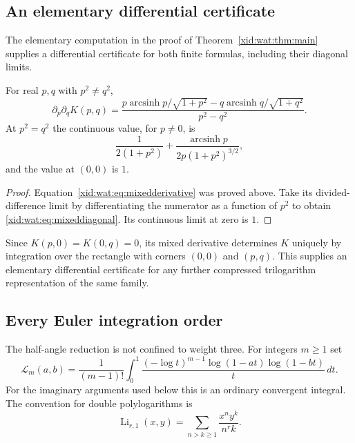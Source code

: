 \subsection{An elementary differential certificate}

The elementary computation in the proof of
Theorem~\ref{xid:wat:thm:main} supplies a differential certificate for
both finite formulas, including their diagonal limits.

\begin{proposition}
\label{xid:wat:prop:derivative}
For real $p,q$ with $p^2\ne q^2$,
\begin{equation}\label{xid:wat:eq:mixedderivative}
 \partial_p\partial_qK(p,q)
 =\frac{p\operatorname{arcsinh}p/\sqrt{1+p^2}
       -q\operatorname{arcsinh}q/\sqrt{1+q^2}}{p^2-q^2}.
\end{equation}
At $p^2=q^2$ the continuous value, for $p\ne0$, is
\begin{equation}\label{xid:wat:eq:mixeddiagonal}
 \frac1{2(1+p^2)}
 +\frac{\operatorname{arcsinh}p}{2p(1+p^2)^{3/2}},
\end{equation}
and the value at $(0,0)$ is $1$.
\end{proposition}

\begin{proof}
Equation~\eqref{xid:wat:eq:mixedderivative} was proved above. Take its
divided-difference limit by differentiating the numerator as a
function of $p^2$ to obtain \eqref{xid:wat:eq:mixeddiagonal}.
Its continuous limit at zero is $1$.
\end{proof}

Since $K(p,0)=K(0,q)=0$, its mixed derivative determines $K$ uniquely
by integration over the rectangle with corners $(0,0)$ and $(p,q)$.
This supplies an elementary differential certificate for any further
compressed trilogarithm representation of the same family.

\subsection{Every Euler integration order}

The half-angle reduction is not confined to weight three. For
integers $m\geq1$ set
\begin{equation}\label{xid:wat:eq:Lm}
 \mathcal L_m(a,b)=\frac1{(m-1)!}\int_0^1
    \frac{(-\log t)^{m-1}\log(1-at)\log(1-bt)}t\,dt.
\end{equation}
For the imaginary arguments used below this is an ordinary convergent
integral. The convention for double polylogarithms is
\[
 \operatorname{Li}_{r,1}(x,y)
 =\sum_{n>k\geq1}\frac{x^ny^k}{n^r k}.
\]

